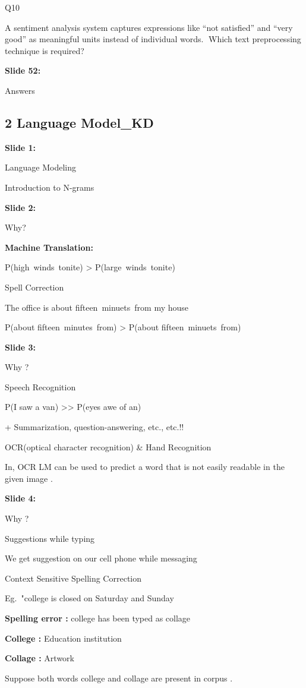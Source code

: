 \documentclass[11pt,a4paper]{article}
\begin{document}
Q10

A sentiment analysis system captures expressions like “not satisfied” and “very good” as meaningful units instead of individual words. Which text preprocessing technique is required?

\textbf{Slide 52:}

Answers


\subsection{2 Language Model_KD}

\textbf{Slide 1:}

Language Modeling

Introduction to N-grams

\textbf{Slide 2:}

Why?

\textbf{Machine Translation:} 

P(high winds tonite) > P(large winds tonite)

Spell Correction

The office is about fifteen minuets from my house

P(about fifteen minutes from) > P(about fifteen minuets from)

\textbf{Slide 3:}

Why ?

Speech Recognition

P(I saw a van) >> P(eyes awe of an)

+ Summarization, question-answering, etc., etc.!!

OCR(optical character recognition) & Hand Recognition

In, OCR LM can be used to predict a word that is not easily readable in the given image .

\textbf{Slide 4:}

Why ?

Suggestions while typing

We get suggestion on our cell phone while messaging

Context Sensitive Spelling Correction

Eg. "college is closed on Saturday and Sunday

\textbf{Spelling error :}  college has been typed as collage

\textbf{College :} Education institution

\textbf{Collage :}  Artwork

Suppose both words college and collage are present in corpus .
\end{document}

